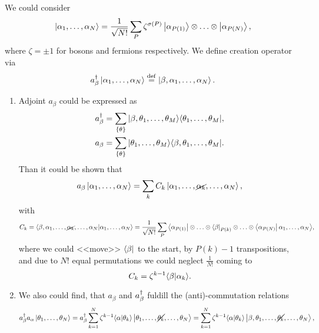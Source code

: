 

We could consider
\begin{equation*}
	\left| \alpha_1,\ldots,\alpha_N \right\rangle = \frac{1}{\sqrt{N!}} \sum_{P} \zeta^{\sigma(P)} 
	\left| \alpha_{P(1)} \right\rangle \otimes \ldots \otimes \left| \alpha_{P(N)} \right\rangle,
\end{equation*}
where $\zeta= \pm 1$ for bosons and fermions respectively. We define creation operator via
\begin{equation*}
	a_{\beta}^{\dag} \left| \alpha_1,\ldots,\alpha_N \right\rangle \overset{\mathrm{def}}{=} \left| \beta,\alpha_1,\ldots,\alpha_N \right\rangle.
\end{equation*}
\begin{enumerate}
	\item Adjoint $a_\beta$ could be expressed as
	\begin{align*}
		a_\beta\D &= \sum_{\{\theta\}} \kb{\beta, \theta_1, \ldots, \theta_M}{\theta_1, \ldots, \theta_{M}}, \\
		a_\beta &= \sum_{\{\theta\}} \kb{\theta_1, \ldots, \theta_M}{\beta, \theta_1, \ldots, \theta_{M}}.
	\end{align*}
	Than it could be shown that
	\begin{equation*}
		a_\beta \left| \alpha_1,\ldots,\alpha_N \right\rangle = \sum_k C_k \left| \alpha_1,\ldots,\cancel{\alpha_k},\ldots,\alpha_N \right\rangle,
	\end{equation*}
	with 
	\begin{align*}
		C_k = \bk{\beta,\alpha_1,\ldots,\cancel{\alpha_k},\ldots,\alpha_N}{\alpha_1,\ldots,\alpha_N} 
		= \frac{1}{\sqrt{N!}}\sum_{P} \bra{\alpha_{P(1)}} \otimes \ldots \otimes \bra{\beta}_{P(k)} \otimes \ldots \otimes \bra{\alpha_{P(N)}} \alpha_1,\ldots,\alpha_N \big\rangle,
	\end{align*}
	where we could <<move>> $\left\langle \beta \right|$  to the start, by $P(k)-1$ transpositions, and due to $N!$ equal permutations we could neglect $\frac{1}{N!}$  coming to
	\begin{equation*}
		C_k = \zeta^{k-1} \bk{\beta}{\alpha_k}.
	\end{equation*}
	\item We also could find, that $a_\beta$ and $a_\beta^{\dag}$ fuldill the (anti)-commutation relations 
	\begin{align*}
		a_\beta\D a_\alpha \ket{\theta_1,\ldots,\theta_N} &= a_\beta\D \sum_{k=1}^{N} \zeta^{k-1} \bk{\alpha}{\theta_k} \ket{\theta_1,\ldots,\cancel{\theta_k},\ldots,\theta_N} = \sum_{k=1}^{N} \zeta^{k-1} \bk{\alpha}{\theta_k} \ket{\beta,\theta_1,\ldots,\cancel{\theta_k},\ldots,\theta_N}, \\

\end{align*}
\end{enumerate}
